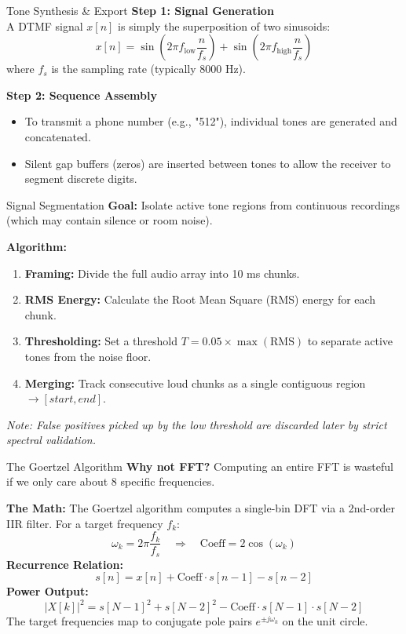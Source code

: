 \documentclass[aspectratio=169]{beamer}
\begin{document}
\begin{frame}{Tone Synthesis \& Export}
    \textbf{Step 1: Signal Generation} \\
    A DTMF signal $x[n]$ is simply the superposition of two sinusoids:
    \[
    x[n] = \sin\left(2\pi f_{\text{low}} \frac{n}{f_s}\right) + \sin\left(2\pi f_{\text{high}} \frac{n}{f_s}\right)
    \]
    where $f_s$ is the sampling rate (typically 8000 Hz).
    
    \vspace{0.5cm}
    \textbf{Step 2: Sequence Assembly}
    \begin{itemize}
        \item To transmit a phone number (e.g., "512"), individual tones are generated and concatenated.
        \item Silent gap buffers (zeros) are inserted between tones to allow the receiver to segment discrete digits.
    \end{itemize}
\end{frame}

\begin{frame}{Signal Segmentation}
    \textbf{Goal:} Isolate active tone regions from continuous recordings (which may contain silence or room noise).
    
    \vspace{0.5cm}
    \textbf{Algorithm:}
    \begin{enumerate}
        \item \textbf{Framing:} Divide the full audio array into 10 ms chunks.
        \item \textbf{RMS Energy:} Calculate the Root Mean Square (RMS) energy for each chunk.
        \item \textbf{Thresholding:} Set a threshold $T = 0.05 \times \max(\text{RMS})$ to separate active tones from the noise floor.
        \item \textbf{Merging:} Track consecutive loud chunks as a single contiguous region $\rightarrow [start, end]$.
    \end{enumerate}
    \vspace{0.3cm}
    \textit{Note: False positives picked up by the low threshold are discarded later by strict spectral validation.}
\end{frame}

\begin{frame}{The Goertzel Algorithm}
    \textbf{Why not FFT?} Computing an entire FFT is wasteful if we only care about 8 specific frequencies.
    
    \vspace{0.5cm}
    \textbf{The Math:}
    The Goertzel algorithm computes a single-bin DFT via a 2nd-order IIR filter. For a target frequency $f_k$:
    \[
    \omega_k = 2\pi \frac{f_k}{f_s} \quad \Rightarrow \quad \text{Coeff} = 2\cos(\omega_k)
    \]
    \textbf{Recurrence Relation:}
    \[
    s[n] = x[n] + \text{Coeff} \cdot s[n-1] - s[n-2]
    \]
    \textbf{Power Output:}
    \[
    |X[k]|^2 = s[N-1]^2 + s[N-2]^2 - \text{Coeff} \cdot s[N-1] \cdot s[N-2]
    \]
    The target frequencies map to conjugate pole pairs $e^{\pm j\omega_k}$ on the unit circle.
\end{frame}
\end{document}
